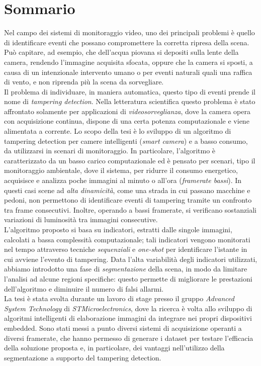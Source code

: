 \newpage
\chapter*{Sommario}


Nel campo dei sistemi di monitoraggio video, uno dei principali problemi \`e quello di identificare eventi che possano compromettere la corretta ripresa della scena.
Pu\`o capitare, ad esempio, che dell'acqua piovana si depositi sulla lente della camera, rendendo l'immagine acquisita sfocata, oppure che la camera si sposti, a causa di un intenzionale intervento umano o per eventi naturali quali una raffica di vento, e non riprenda pi\`u la scena da sorvegliare.\\
Il problema di individuare, in maniera automatica, questo tipo di eventi prende il nome di \textit{tampering detection}. 
Nella letteratura scientifica questo problema \`e stato affrontato solamente per applicazioni di \textit{videosorveglianza}, dove la camera opera con acquisizione continua, dispone di una certa potenza computazionale e viene alimentata a corrente.
Lo scopo della tesi \`e lo sviluppo di un algoritmo di tampering detection per camere intelligenti (\textit{smart camera}) e a basso consumo, da utilizzarsi in scenari di monitoraggio. In particolare, l'algoritmo \`e caratterizzato da un basso carico computazionale ed \`e pensato per scenari, tipo il monitoraggio ambientale, dove il sistema, per ridurre il consumo energetico, acquisisce e analizza poche immagini al minuto o all'ora (\textit{framerate bassi}).
In questi casi scene ad \textit{alta dinamicit\`a}, come una strada in cui passano macchine e pedoni, non permettono di identificare eventi di tampering tramite un confronto tra frame consecutivi. 
Inoltre, operando a bassi framerate, si verificano sostanziali variazioni di luminosit\`a tra immagini consecutive. \\ 
L'algoritmo proposto si basa su indicatori, estratti dalle singole immagini, calcolati a bassa complessit\`a computazionale; tali indicatori vengono monitorati nel tempo attraverso tecniche \textit{sequenziali} e \textit{one-shot} per identificare l'istante in cui avviene l'evento di tampering.
Data l'alta variabilit\`a degli indicatori utilizzati, abbiamo introdotto una fase di \textit{segmentazione} della scena, in modo da limitare l'analisi ad alcune regioni specifiche:
questo permette di migliorare le prestazioni dell'algoritmo e diminuire il numero di falsi allarmi.\\
La tesi \`e stata svolta durante un lavoro di stage presso il gruppo \textit{Advanced System Technology} di \textit{STMicroelectronics}, dove la ricerca \`e volta allo sviluppo di algoritmi intelligenti di elaborazione immagini da integrare nei propri dispositivi embedded.
Sono stati messi a punto diversi sistemi di acquisizione operanti a diversi framerate, che hanno permesso di generare i dataset per testare l'efficacia della soluzione proposta e, in particolare, dei vantaggi nell'utilizzo della segmentazione a supporto del tampering detection. 
